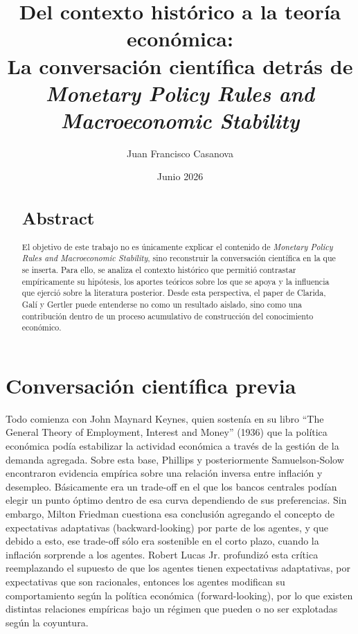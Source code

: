 \documentclass[12pt]{article}
\title{Del contexto histórico a la teoría económica:\\
La conversación científica detrás de \textit{Monetary Policy Rules and Macroeconomic Stability}}
\author{Juan Francisco Casanova}
\date{Junio 2026}
\begin{document}
\maketitle


\begin{abstract}

\section*{Abstract}

    El objetivo de este trabajo no es únicamente explicar el contenido de \textit{Monetary Policy Rules and Macroeconomic Stability}, sino reconstruir la conversación científica en la que se inserta. Para ello, se analiza el contexto histórico que permitió contrastar empíricamente su hipótesis, los aportes teóricos sobre los que se apoya y la influencia que ejerció sobre la literatura posterior. Desde esta perspectiva, el paper de Clarida, Galí y Gertler puede entenderse no como un resultado aislado, sino como una contribución dentro de un proceso acumulativo de construcción del conocimiento económico.
    
\end{abstract}

\section*{Conversación científica previa}
\indent Todo comienza con John Maynard Keynes, quien sostenía en su libro “The General Theory of Employment, Interest and Money” (1936) que la política económica podía estabilizar la actividad económica a través de la gestión de la demanda agregada. Sobre esta base, Phillips y posteriormente Samuelson-Solow encontraron evidencia empírica sobre una relación inversa entre inflación y desempleo. Básicamente era un trade-off en el que los bancos centrales podían elegir un punto óptimo dentro de esa curva dependiendo de sus preferencias. Sin embargo, Milton Friedman cuestiona esa conclusión agregando el concepto de expectativas adaptativas (backward-looking) por parte de los agentes, y que debido a esto, ese trade-off sólo era sostenible en el corto plazo, cuando la inflación sorprende a los agentes. Robert Lucas Jr. profundizó esta crítica reemplazando el supuesto de que los agentes tienen expectativas adaptativas, por expectativas que son racionales, entonces los agentes modifican su comportamiento según la política económica (forward-looking), por lo que existen distintas relaciones empíricas bajo un régimen que pueden o no ser explotadas según la coyuntura. \\
\end{document}
